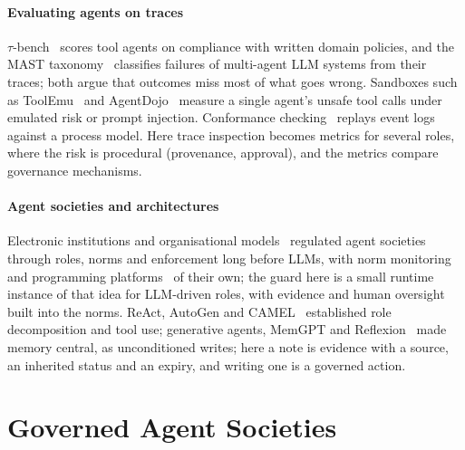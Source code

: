 \documentclass[10pt,conference]{IEEEtran}
\begin{document}
\paragraph{Evaluating agents on traces}
$\tau$-bench~\cite{yao2025taubench} scores tool agents on compliance with written domain policies, and the MAST taxonomy~\cite{cemri2025mast} classifies failures of multi-agent LLM systems from their traces; both argue that outcomes miss most of what goes wrong. Sandboxes such as ToolEmu~\cite{ruan2024toolemu} and AgentDojo~\cite{debenedetti2024agentdojo} measure a single agent's unsafe tool calls under emulated risk or prompt injection. Conformance checking~\cite{carmona2018conformance} replays event logs against a process model. Here trace inspection becomes metrics for several roles, where the risk is procedural (provenance, approval), and the metrics compare governance mechanisms.

\paragraph{Agent societies and architectures}
Electronic institutions and organisational models~\cite{esteva2001ei,hubner2007moise} regulated agent societies through roles, norms and enforcement long before LLMs, with norm monitoring~\cite{dastani2018monitoring} and programming platforms~\cite{boissier2020jacamo} of their own; the guard here is a small runtime instance of that idea for LLM-driven roles, with evidence and human oversight built into the norms. ReAct, AutoGen and CAMEL~\cite{yao2023react,wu2023autogen,li2023camel} established role decomposition and tool use; generative agents, MemGPT and Reflexion~\cite{park2023generative,packer2023memgpt,shinn2023reflexion} made memory central, as unconditioned writes; here a note is evidence with a source, an inherited status and an expiry, and writing one is a governed action.

\section{Governed Agent Societies}
\label{sec:model}
\end{document}
